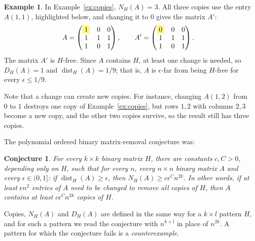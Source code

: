 \documentclass{article}
\DeclareMathOperator{\dist}{dist}
\theoremstyle{plain}
\newtheorem{conjecture}[theorem]{Conjecture}
\theoremstyle{definition}
\newtheorem{example}{Example}
\begin{document}
  \begin{example}\label{ex:distance}
  In Example~\ref{ex:copies}, $N_H(A) = 3$. All three copies use the entry $A(1,1)$, highlighted
  below, and changing it to $0$ gives the matrix $A'$:
  \[
  A = \begin{pmatrix}
    \colorbox{yellow!50}{$1$} & 0 & 0 \\
    1 & 1 & 1 \\
    1 & 0 & 1
  \end{pmatrix},
  \qquad
  A' = \begin{pmatrix}
    \colorbox{yellow!50}{$0$} & 0 & 0 \\
    1 & 1 & 1 \\
    1 & 0 & 1
  \end{pmatrix}.
  \]
  The matrix $A'$ is $H$-free. Since $A$ contains $H$, at least one
  change is needed, so $D_H(A) = 1$ and $\dist_H(A) = 1/9$; that is, $A$ is $\epsilon$-far from
  being $H$-free for every $\epsilon \le 1/9$.

  Note that a change can create new
  copies. For instance, changing $A(1,2)$ from $0$ to $1$ destroys one copy
  of Example~\ref{ex:copies}, but rows $1, 2$ with columns $2, 3$ become a new copy, and the other two copies survive, so the result still has three copies.
  \end{example}

 The polynomial ordered binary matrix-removal conjecture was:
 
\begin{conjecture}\label{conj:poly-removal}
For every $k \times k$ binary matrix $H$, there are constants $c, C > 0$, depending only on $H$, such that for every $n$, every $n\times n$ binary matrix $A$ and every $\epsilon \in (0,1]$: if $\dist_H(A) \ge \epsilon$, then $N_H(A) \ge c\epsilon^C n^{2k}$. In other words, if at least $\epsilon n^2$ entries of $A$ need to be changed to remove all copies of $H$, then
$A$ contains at least $c\epsilon^Cn^{2k}$ copies of $H$.
\end{conjecture}

Copies, $N_H(A)$ and $D_H(A)$ are defined in the same way for a $k \times l$ pattern $H$, and for such a pattern we read the conjecture with $n^{k+l}$ in place of $n^{2k}$. A pattern for which the conjecture fails is a \emph{counterexample}.
\end{document}
